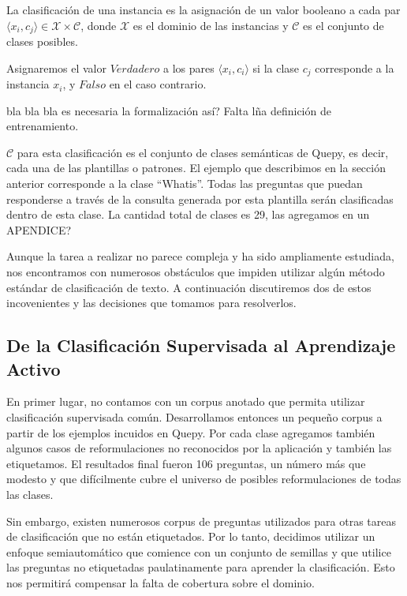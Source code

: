 \begin{definition}
La clasificación de una instancia es la asignación de un valor booleano a cada par $\langle x_i, c_j \rangle \in \mathcal{X} \times \mathcal{C}$, donde $\mathcal{X}$ es el dominio de las instancias y $\mathcal{C}$ es el conjunto de clases posibles.
\end{definition}

Asignaremos el valor $Verdadero$ a los pares $\langle x_i, c_i \rangle$ si la clase $c_j$ corresponde a la instancia $x_i$, y $Falso$ en el caso contrario.

bla bla bla es necesaria la formalización así? Falta lña definición de entrenamiento.

$\mathcal{C}$ para esta clasificación es el conjunto de clases semánticas de Quepy, es decir, cada una de las plantillas o patrones. El ejemplo que describimos en la sección anterior corresponde a la clase ``Whatis''. Todas las preguntas que puedan responderse a través de la consulta generada por esta plantilla serán clasificadas dentro de esta clase. La cantidad total de clases es 29, las agregamos en un APENDICE?




Aunque la tarea a realizar no parece compleja y ha sido ampliamente estudiada, nos encontramos con numerosos obstáculos que impiden utilizar algún método estándar de clasificación de texto. A continuación discutiremos dos de estos incovenientes y las decisiones que tomamos para resolverlos.

\subsection{De la Clasificación Supervisada al Aprendizaje Activo}

En primer lugar, no contamos con un corpus anotado que permita utilizar clasificación supervisada común. Desarrollamos entonces un pequeño corpus a partir de los ejemplos incuidos en Quepy. Por cada clase agregamos también algunos casos de reformulaciones no reconocidos por la aplicación y también las etiquetamos. El resultados final fueron 106 preguntas, un número más que modesto y que difícilmente cubre el universo de posibles reformulaciones de todas las clases.

Sin embargo, existen numerosos corpus de preguntas utilizados para otras tareas de clasificación que no están etiquetados. Por lo tanto, decidimos utilizar un enfoque semiautomático que comience con un conjunto de semillas y que utilice las preguntas no etiquetadas paulatinamente para aprender la clasificación. Esto nos permitirá compensar la falta de cobertura sobre el dominio.

